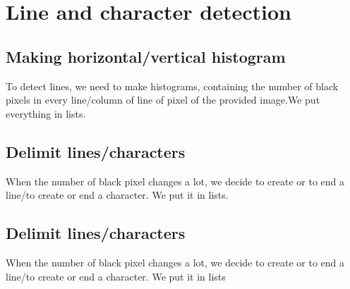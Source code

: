 \begin{center}
\end{center}

\begin{center}
\end{center}

\section{Line and character detection}

\subsection{Making horizontal/vertical histogram}

To detect lines, we need to make histograms, containing the number of black pixels in every line/column of line of pixel of the provided image.We put everything in lists.

\subsection{Delimit lines/characters}

When the number of black pixel changes a lot, we decide to create or to end a line/to create or end a character. We put it in lists.

\subsection{Delimit lines/characters}

When the number of black pixel changes a lot, we decide to create or to end a line/to create or end a character. We put it in lists
